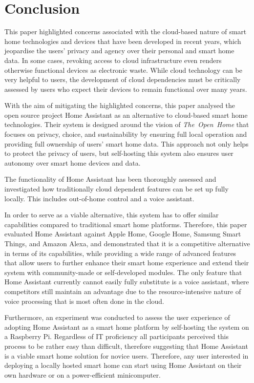 
\section{Conclusion}

This paper highlighted concerns associated with the cloud-based nature of smart home technologies and devices that have been developed in recent years, which jeopardise the users' privacy and agency over their personal and smart home data. In some cases, revoking access to cloud infrastructure even renders otherwise functional devices as electronic waste. While cloud technology can be very helpful to users, the development of cloud dependencies must be critically assessed by users who expect their devices to remain functional over many years.

With the aim of mitigating the highlighted concerns, this paper analysed the open source project Home Assistant as an alternative to cloud-based smart home technologies. Their system is designed around the vision of \textit{The~Open~Home} that focuses on privacy, choice, and sustainability by ensuring full local operation and providing full ownership of users' smart home data. This approach not only helps to protect the privacy of users, but self-hosting this system also ensures user autonomy over smart home devices and data.

The functionality of Home Assistant has been thoroughly assessed and investigated how traditionally cloud dependent features can be set up fully locally. This includes out-of-home control and a voice assistant.

In order to serve as a viable alternative, this system has to offer similar capabilities compared to traditional smart home platforms. Therefore, this paper evaluated Home Assistant against Apple Home, Google Home, Samsung Smart Things, and Amazon Alexa, and demonstrated that it is a competitive alternative in terms of its capabilities, while providing a wide range of advanced features that allow users to further enhance their smart home experience and extend their system with community-made or self-developed modules.
The only feature that Home Assistant currently cannot easily fully substitute is a voice assistant, where competitors still maintain an advantage due to the resource-intensive nature of voice processing that is most often done in the cloud.

Furthermore, an experiment was conducted to assess the user experience of adopting Home Assistant as a smart home platform by self-hosting the system on a Raspberry Pi. Regardless of IT proficiency all participants perceived this process to be rather easy than difficult, therefore suggesting that Home Assistant is a viable smart home solution for novice users. Therefore, any user interested in deploying a locally hosted smart home can start using Home Assistant on their own hardware or on a power-efficient minicomputer.

